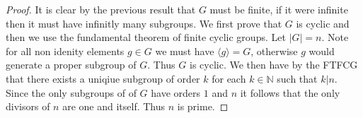 \documentclass[11pt,largemargins]{homework}
\newcommand{\N}{\mathbb{N}}
\begin{document}
\begin{proof}
    It is clear by the previous result that $G$ must be finite, if it were infinite then it must have infinitly many subgroups. 
We first prove that $G$ is cyclic and then we use the fundamental theorem of finite cyclic groups. Let $|G| = n$. Note for all non idenity elements 
$g \in G$ we must have $\langle g \rangle = G$, otherwise $g$ would generate a proper subgroup of $G$. 
Thus $G$ is cyclic. We then have by the FTFCG that there exists a uniqiue subgroup of order $k$ for each $k \in \N$ such that $k|n$.
Since the only subgroups of of $G$ have orders $1$ and $n$ it follows that the only divisors of $n$ are one and itself. Thus $n$ is 
prime.  
    
\end{proof}
\end{document}
